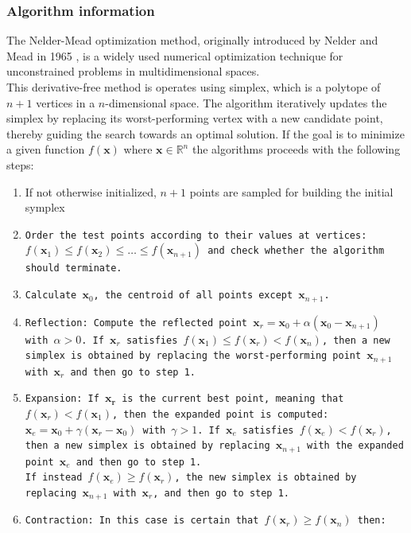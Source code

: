 \subsubsection{Algorithm information}
The Nelder-Mead optimization method, originally introduced by Nelder and Mead in 1965 \cite{NelderMeads}, is a widely used numerical optimization technique for unconstrained problems in multidimensional spaces. \\
This derivative-free method is operates using simplex, which is a polytope of $n+1$ vertices in a $n$-dimensional space.
The algorithm iteratively updates the simplex by replacing its worst-performing vertex with a new candidate point, thereby guiding the search towards an optimal solution. 
If the goal is to minimize a given function $f(\mathbf{x})$ where $\mathbf{x} \in \mathbb{R}^n$ the algorithms proceeds with the following steps:\begin{enumerate}
    \item If not otherwise initialized, $n+1$ points are sampled for building the initial symplex
    \item \tt{Order} the test points according to their values at vertices: $f(\mathbf{x}_1) \leq f(\mathbf{x}_2) \leq \dots \leq f(\mathbf{x}_{n+1})$ and check whether the algorithm should terminate.
    \item \tt{Calculate} $\mathbf{x}_0$, the centroid of all points except $\mathbf{x}_{n+1}$.
    \item \tt{Reflection}: Compute the reflected point $\mathbf{x}_r = \mathbf{x}_0 + \alpha(\mathbf{x}_0 - \mathbf{x}_{n+1})$ with $\alpha > 0$. 
            If $\mathbf{x}_r$ satisfies $f(\mathbf{x}_1) \leq f(\mathbf{x}_r) < f(\mathbf{x}_n)$, then a new simplex is obtained by replacing the worst-performing point $\mathbf{x}_{n+1}$ with $\mathbf{x}_r$ and then go to step 1.
    \item \tt{Expansion}: If $\mathbf{x_r}$ is the current best point, meaning that $f(\mathbf{x}_r) < f(\mathbf{x}_1)$, then the expanded point is computed: $\mathbf{x}_e = \mathbf{x}_0 + \gamma(\mathbf{x}_r-\mathbf{x}_0)$ with $\gamma>1$.
           If $\mathbf{x}_e$ satisfies $f(\mathbf{x}_e) < f(\mathbf{x}_r)$, then a new simplex is obtained by replacing $\mathbf{x}_{n+1}$ with the expanded point $\mathbf{x}_e$ and then go to step 1.\\
            If instead $f(\mathbf{x}_e) \geq f(\mathbf{x}_r)$, the new simplex is obtained by replacing $\mathbf{x}_{n+1}$ with $\mathbf{x}_r$, and then go to step 1.
    \item \tt{Contraction}: In this case is certain that $f(\mathbf{x}_r) \geq f(\mathbf{x}_n)$ then:\begin{itemize}

\end{itemize}
\end{enumerate}
